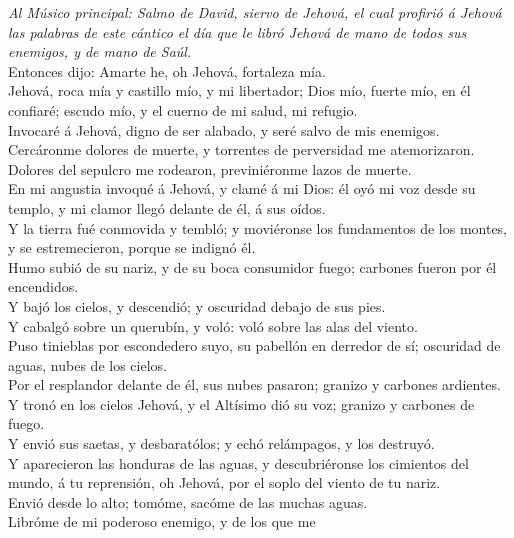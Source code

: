  \emph{Al Músico principal: Salmo de David, siervo de
Jehová, el cual profirió á Jehová las palabras de este cántico el día
que le libró Jehová de mano de todos sus enemigos, y de mano de Saúl.}\\
Entonces dijo: Amarte he, oh Jehová, fortaleza mía.\\
 Jehová, roca mía y castillo mío, y mi libertador; Dios mío,
fuerte mío, en él confiaré; escudo mío, y el cuerno de mi salud, mi
refugio.\\
 Invocaré á Jehová, digno de ser alabado, y seré salvo de
mis enemigos.\\
 Cercáronme dolores de muerte, y torrentes de perversidad me
atemorizaron.\\
 Dolores del sepulcro me rodearon, previniéronme lazos de
muerte.\\
 En mi angustia invoqué á Jehová, y clamé á mi Dios: él oyó
mi voz desde su templo, y mi clamor llegó delante de él, á sus oídos.\\
 Y la tierra fué conmovida y tembló; y moviéronse los
fundamentos de los montes, y se estremecieron, porque se indignó él.\\
 Humo subió de su nariz, y de su boca consumidor fuego;
carbones fueron por él encendidos.\\
 Y bajó los cielos, y descendió; y oscuridad debajo de sus
pies.\\
 Y cabalgó sobre un querubín, y voló: voló sobre las alas
del viento.\\
 Puso tinieblas por escondedero suyo, su pabellón en
derredor de sí; oscuridad de aguas, nubes de los cielos.\\
 Por el resplandor delante de él, sus nubes pasaron;
granizo y carbones ardientes.\\
 Y tronó en los cielos Jehová, y el Altísimo dió su voz;
granizo y carbones de fuego.\\
 Y envió sus saetas, y desbaratólos; y echó relámpagos, y
los destruyó.\\
 Y aparecieron las honduras de las aguas, y descubriéronse
los cimientos del mundo, á tu reprensión, oh Jehová, por el soplo del
viento de tu nariz.\\
 Envió desde lo alto; tomóme, sacóme de las muchas aguas.\\
 Libróme de mi poderoso enemigo, y de los que me
